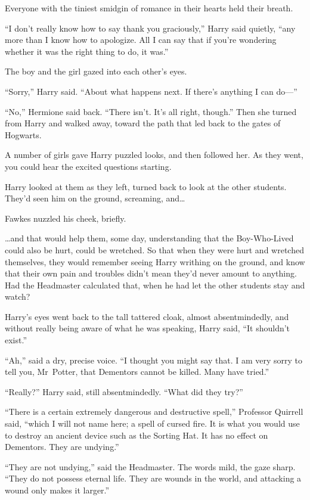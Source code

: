 Everyone with the tiniest smidgin of romance in their hearts held their breath.

“I don’t really know how to say thank you graciously,” Harry said quietly, “any more than I know how to apologize. All I can say that if you’re wondering whether it was the right thing to do, it was.”

The boy and the girl gazed into each other’s eyes.

“Sorry,” Harry said. “About what happens next. If there’s anything I can do—”

“No,” Hermione said back. “There isn’t. It’s all right, though.” Then she turned from Harry and walked away, toward the path that led back to the gates of Hogwarts.

A number of girls gave Harry puzzled looks, and then followed her. As they went, you could hear the excited questions starting.

Harry looked at them as they left, turned back to look at the other students. They’d seen him on the ground, screaming, and…

Fawkes nuzzled his cheek, briefly.

…and that would help them, some day, understanding that the Boy-Who-Lived could also be hurt, could be wretched. So that when they were hurt and wretched themselves, they would remember seeing Harry writhing on the ground, and know that their own pain and troubles didn’t mean they’d never amount to anything. Had the Headmaster calculated that, when he had let the other students stay and watch?

Harry’s eyes went back to the tall tattered cloak, almost absentmindedly, and without really being aware of what he was speaking, Harry said, “It shouldn’t exist.”

“Ah,” said a dry, precise voice. “I thought you might say that. I am very sorry to tell you, Mr~Potter, that Dementors cannot be killed. Many have tried.”

“Really?” Harry said, still absentmindedly. “What did they try?”

“There is a certain extremely dangerous and destructive spell,” Professor Quirrell said, “which I will not name here; a spell of cursed fire. It is what you would use to destroy an ancient device such as the Sorting Hat. It has no effect on Dementors. They are undying.”

“They are not undying,” said the Headmaster. The words mild, the gaze sharp. “They do not possess eternal life. They are wounds in the world, and attacking a wound only makes it larger.”

